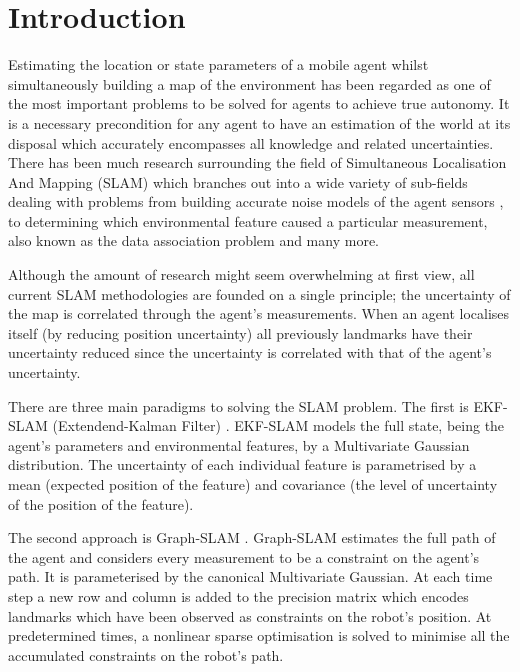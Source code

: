 \documentclass{frontiersSCNS} %
\begin{document}
\section{Introduction}

Estimating the location or state parameters of a mobile agent whilst simultaneously building a map of the environment has been
regarded as one of the most important problems to be solved for agents to achieve true autonomy. It is a necessary precondition for 
any agent to have an estimation of the world at its disposal which accurately encompasses all knowledge and related uncertainties. 
There has been much research surrounding the field of Simultaneous Localisation And Mapping (SLAM) which branches out into a wide variety of sub-fields 
dealing with problems from building accurate noise models of the agent sensors \cite{Plagemann07gaussianbeam}, to determining which environmental 
feature caused a particular measurement, also known as the data association problem \cite{DataAssociation2003} and many more. 


Although the amount of research might seem overwhelming at first view, all current SLAM methodologies are founded on a single principle; 
the uncertainty of the map is correlated through the agent's measurements. When an agent localises itself (by reducing position uncertainty)
all previously landmarks have their uncertainty reduced since the uncertainty is correlated with that of the agent's uncertainty.


There are three main paradigms to solving the SLAM problem. The first is EKF-SLAM (Extendend-Kalman Filter) \cite{SLAM_part1}.
EKF-SLAM models the full state, being the agent's parameters and environmental features, by a Multivariate Gaussian distribution. 
The uncertainty of each individual feature is parametrised by a mean (expected position of the feature) and covariance 
(the level of uncertainty of the position of the feature).

The second approach is Graph-SLAM \cite{TutGraphSLAM}. Graph-SLAM estimates the full path of the agent and considers every measurement to 
be a constraint on the agent's path. It is parameterised by the canonical Multivariate Gaussian. At each time step a new row and column 
is added to the precision matrix which encodes landmarks which have been observed as constraints on the robot's position.
At predetermined times, a nonlinear sparse optimisation is solved to minimise all the accumulated constraints on the robot's path.
\end{document}
